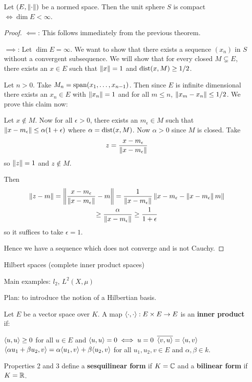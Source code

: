 \begin{thm}
	Let $(E,\left\lVert \cdot \right\rVert)$ be a normed space.
	Then the unit sphere $S$ is compact $\iff \dim E < \infty$.
\end{thm}

\begin{proof}
	$\impliedby$: This follows immediately from the previous theorem.
	
	$\implies$: Let $\dim E = \infty$.
	We want to show that there exists a sequence $(x_n)$ in $S$ without a convergent subsequence.
	We will show that for every closed $M \subsetneq E$, there exists an $x \in E$ such that $\left\lVert x \right\rVert=1$ and $\operatorname{dist}(x,M) \geq 1/2$.
	
	Let $n>0$.
	Take $M_n = \operatorname{span}(x_1,\ldots,x_{n-1})$.
	Then since $E$ is infinite dimensional there exists an $x_n \in E$ with $\left\lVert x_n \right\rVert=1$ and for all $m \leq n$, $\left\lVert x_m-x_n \right\rVert \leq 1/2$.
	We prove this claim now:
	
	Let $x \notin M$.
	Now for all $\epsilon>0$, there exists an $m_\epsilon \in M$ such that $\left\lVert x-m_\epsilon \right\rVert \leq \alpha(1+\epsilon)$ where $\alpha = \operatorname{dist}(x,M)$.
	Now $\alpha>0$ since $M$ is closed.
	Take
	\[z = \frac{x-m_\epsilon}{\left\lVert x-m_\epsilon \right\rVert}\]
	so $\left\lVert z \right\rVert=1$ and $z \notin M$.
	
	Then
	\begin{multline*}
		\left\lVert z-m \right\rVert = \left\lVert \frac{x-m_\epsilon}{\left\lVert x-m_\epsilon \right\rVert}-m \right\rVert = \frac{1}{\left\lVert x-m_\epsilon \right\rVert}\left\lVert x-m_\epsilon - \left\lVert x-m_\epsilon \right\rVert m \right\rVert \\
		\geq \frac{\alpha}{\left\lVert x-m_\epsilon \right\rVert} \geq \frac{1}{1+\epsilon}
	\end{multline*}
	so it suffices to take $\epsilon=1$.
	
	Hence we have a sequence which does not converge and is not Cauchy.
	
\end{proof}

Hilbert spaces (complete inner product spaces)

Main examples: $l_2$, $L^2(X,\mu)$

Plan: to introduce the notion of a Hilbertian basis.

\begin{defn}
	Let $E$ be a vector space over $K$.
	A map ${\left\langle \cdot,\cdot \right\rangle}: E \times E \to E$ is an \textbf{inner product} if:
	\begin{enum}
		\io ${\left\langle u,u \right\rangle} \geq 0$ for all $u \in E$ and ${\left\langle u,u \right\rangle}=0 \iff u=0$
		\io $\overline{{\left\langle v,u \right\rangle}} = {\left\langle u,v \right\rangle}$
		\io ${\left\langle \alpha u_1 + \beta u_2, v \right\rangle} = \alpha{\left\langle u_1,v \right\rangle} + \beta{\left\langle u_2,v \right\rangle}$ for all $u_1,u_2,v \in E$ and $\alpha,\beta \in k$.
	\end{enum}
	Properties 2 and 3 define a \textbf{sesquilinear form} if $K=\mathbb{C}$ and a \textbf{bilinear form} if $K=\mathbb{R}$.
\end{defn}

